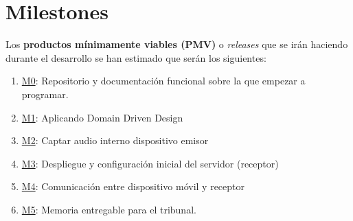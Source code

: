 \section{Milestones}
Los \textbf{productos mínimamente viables (PMV)} o \emph{releases} que se irán haciendo durante el
desarrollo se han estimado que serán los siguientes:

\begin{enumerate}
    \item \href{https://github.com/migueorg/One-touch-music-streaming-TFG-ETSIIT/milestone/1}{M0}: Repositorio y documentación funcional sobre la que empezar a programar.
    \item \href{https://github.com/migueorg/One-touch-music-streaming-TFG-ETSIIT/milestone/2}{M1}: Aplicando Domain Driven Design
    \item \href{https://github.com/migueorg/One-touch-music-streaming-TFG-ETSIIT/milestone/3}{M2}: Captar audio interno dispositivo emisor
    \item \href{https://github.com/migueorg/One-touch-music-streaming-TFG-ETSIIT/milestone/4}{M3}: Despliegue y configuración inicial del servidor (receptor)
    \item \href{https://github.com/migueorg/One-touch-music-streaming-TFG-ETSIIT/milestone/5}{M4}: Comunicación entre dispositivo móvil y receptor
    \item \href{https://github.com/migueorg/One-touch-music-streaming-TFG-ETSIIT/milestone/10}{M5}: Memoria entregable para el tribunal.
\end{enumerate}